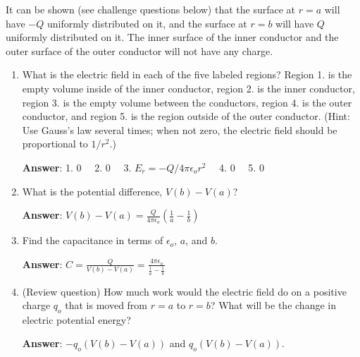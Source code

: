\documentclass{article}
\begin{document}


It can be shown (see challenge questions below) that the surface at $r=a$ will have $-Q$ uniformly distributed on it, and the surface at $r=b$ will have $Q$ uniformly distributed on it. The inner surface of the inner conductor and the outer surface of the outer conductor will not have any charge.

\begin{enumerate}

  \item What is the electric field in each of the five labeled regions? Region 1. is the empty volume inside of the inner conductor, region 2. is the inner conductor, region 3. is the empty volume between the conductors, region 4. is the outer conductor, and region 5. is the region outside of the outer conductor. (Hint: Use Gauss's law several times; when not zero, the electric field should be proportional to $1/r^2$.)

        \ifsolutions
        \textbf{Answer}: 1. $0\quad$ 2. $0\quad$ 3. $E_r=-Q/4\pi \epsilon_o r^2\quad$ 4. $0\quad$ 5. $0$
        \else
        \vskip 72pt
        \fi

  \item What is the potential difference, $V(b) - V(a)$?


        \ifsolutions
        \textbf{Answer}: $\displaystyle V(b)-V(a)=\frac{Q}{4\pi\epsilon_o}\left(\frac{1}{a}-\frac{1}{b}\right)$

        \else
        \vskip 72pt
        \fi

  \item Find the capacitance in terms of $\epsilon_o$, $a$, and $b$.

        \ifsolutions
        \textbf{Answer}: $\displaystyle C=\frac{Q}{V(b)-V(a)} = \frac{4\pi\epsilon_o}{\frac{1}{a}-\frac{1}{b}}$
        \else
        \vskip 72pt
        \fi

  \item (Review question) How much work would the electric field do on a positive charge $q_o$ that is moved from $r=a$ to $r=b$? What will be the change in electric potential energy?

        \ifsolutions
        \textbf{Answer}: $-q_o(V(b)-V(a))$ and $q_o(V(b)-V(a))$.
        \fi

\end{enumerate}
\end{document}
